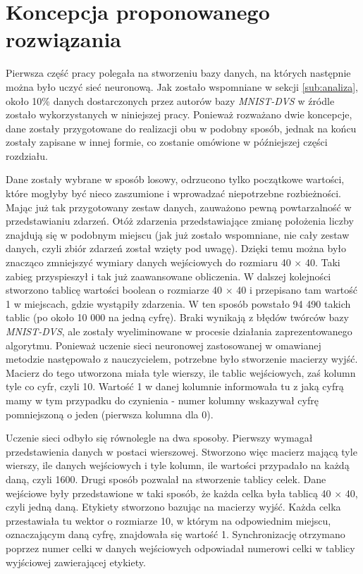 \section{Koncepcja proponowanego rozwiązania}
\label{sub:koncepcja}

Pierwsza część pracy polegała na stworzeniu bazy danych, na których następnie można było uczyć sieć neuronową. Jak zostało wspomniane w sekcji \ref{sub:analiza}, około 10\% danych dostarczonych przez autorów bazy \textit{MNIST-DVS} w źródle \cite{MNIST_DVS} zostało wykorzystanych w niniejszej pracy. Ponieważ rozważano dwie koncepcje, dane zostały przygotowane do realizacji obu w podobny sposób, jednak na końcu zostały zapisane w innej formie, co zostanie omówione w późniejszej części rozdziału.

Dane zostały wybrane w sposób losowy, odrzucono tylko początkowe wartości, które mogłyby być nieco zaszumione i wprowadzać niepotrzebne rozbieżności. Mając już tak przygotowany zestaw danych, zauważono pewną powtarzalność w przedstawianiu zdarzeń. Otóż zdarzenia przedstawiające zmianę położenia liczby znajdują się w podobnym miejscu (jak już zostało wspomniane, nie cały zestaw danych, czyli zbiór zdarzeń został wzięty pod uwagę). Dzięki temu można było znacząco zmniejszyć wymiary danych wejściowych do rozmiaru 40 $\times$ 40. Taki zabieg przyspieszył i tak już zaawansowane obliczenia.
W dalszej kolejności stworzono tablicę wartości boolean o rozmiarze 40 $\times$ 40 i przepisano tam wartość 1 w miejscach, gdzie wystąpiły zdarzenia. W ten sposób powstało 94 490 takich tablic (po około 10 000 na jedną cyfrę). Braki wynikają z błędów twórców bazy \textit{MNIST-DVS}, ale zostały wyeliminowane w procesie działania zaprezentowanego algorytmu. Ponieważ uczenie sieci neuronowej zastosowanej w omawianej metodzie następowało z nauczycielem, potrzebne było stworzenie macierzy wyjść. Macierz do tego utworzona miała tyle wierszy, ile tablic wejściowych, zaś kolumn tyle co cyfr, czyli 10. Wartość 1 w danej kolumnie informowała tu z jaką cyfrą mamy w tym przypadku do czynienia - numer kolumny wskazywał cyfrę pomniejszoną o jeden (pierwsza kolumna dla 0).  

Uczenie sieci odbyło się równolegle na dwa sposoby. Pierwszy wymagał przedstawienia danych w postaci wierszowej. Stworzono więc macierz mającą tyle wierszy, ile danych wejściowych i tyle kolumn, ile wartości przypadało na każdą daną, czyli 1600. Drugi sposób pozwalał na stworzenie tablicy celek. Dane wejściowe były przedstawione w taki sposób, że każda celka była tablicą 40 $\times$ 40, czyli jedną daną. Etykiety stworzono bazując na macierzy wyjść. Każda celka przestawiała tu wektor o rozmiarze 10, w którym na odpowiednim miejscu, oznaczającym daną cyfrę, znajdowała się wartość 1. Synchronizację otrzymano poprzez numer celki w danych wejściowych odpowiadał numerowi celki w tablicy wyjściowej zawierającej etykiety.

